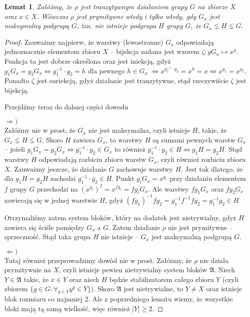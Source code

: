 \documentclass[licencjacka]{pracamgr}
\newtheorem{lemma}{Lemat}[section]
\begin{document}
\begin{lemma}\label{max_group}
	Załóżmy, że $\rho$ jest tranzytywnym działaniem grupy $G$ na zbiorze $X$ oraz $x \in X$.
	Wówczas $\rho$ jest prymitywne wtedy i tylko wtedy, gdy $G_x$ jest maksymalną podgrupą $G$, tzn.
	nie istnieje podgrupa $H$ grupy $G$, że $G_x \lneq H \lneq G$.
\end{lemma}
\begin{proof}
Zauważmy najpierw, że warstwy (lewostronne) $G_x$ odpowiadają jednoznacznie elementom zbioru $X$ --
bijekcja zadana jest wzorem $\zeta \colon g G_x \mapsto x^g$.
Funkcja ta jest dobrze określona oraz jest iniekcją, gdyż $g_1 G_x = g_2 G_x \iff g_1^{-1} \cdot g_2 = h$ dla pewnego $h \in G_x$
$\iff x^{g_1^{-1} \cdot g_2} = x^h = x \iff x^{g_1} = x^{g_2}$.
Ponadto $\zeta$ jest suriekcją, gdyż działanie jest tranzytywne, stąd rzeczywiście $\zeta$ jest bijekcją.

Przejdźmy teraz do dalszej części dowodu

$\Rightarrow)$ \\
Załóżmy nie w prost, że $G_x$ nie jest maksymalna, czyli istnieje $H$, takie, że $G_x \lneq H \lneq G$.
Skoro $H$ zawiera $G_x$, to warstwy $H$ są sumami pewnych warstw $G_x$ -- 
jeżeli $g_1 G_x = g_2 G_x \iff g_1^{-1} \cdot g_2 \in G_x$ to również $g_1^{-1} \cdot g_2 \in H \iff g_1 H = g_2 H$.
Stąd warstwy $H$ odpowiadają rozbiciu zbioru warstw $G_x$, czyli również rozbiciu zbioru $X$.
Zauważmy jeszcze, że działanie $G$ zachowuje warstwy $H$.
Jest tak dlatego, że dla $g_1 H = g_2 H$ zachodzi $g_1^{-1} \cdot g_2 \in H$.
Punkt $g_i G_x = x^{g_i}$ przy działaniu elementem $f$ grupy $G$ przechodzi na $(x^{g_i})^f = x^{f g_i} = f g_i G_x$.
Ale warstwy $f g_1 G_x$ oraz $f g_2 G_x$ zawierają się w jednej warstwie $H$, gdyż $(f g_1)^{-1} f g_2 = g_1^{-1} f^{-1} f g_2 = g_1^{-1} g_2 \in H$.

Otrzymaliśmy zatem system bloków, który na dodatek jest nietrywialny, gdyż $H$ zawiera się ściśle pomiędzy $G_x$ a $G$.
Zatem działanie $\rho$ nie jest prymitywne -- sprzeczność.
Stąd taka grupa $H$ nie istnieje -- $G_x$ jest maksymalną podgrupą $G$.

$\Leftarrow)$ \\
Tutaj również przeprowadzimy dowód nie w prost.
Załóżmy, że $\rho$ nie działa prymitywnie na $X$, czyli istnieje pewien nietrywialny system bloków $\mathfrak{A}$.
Niech $Y \in \mathfrak{A}$ takie, że $x \in Y$ oraz niech $H$ będzie stabilizatorem całego zbioru $Y$
(czyli zbiorem $\{g \in G \colon \forall_{y \in Y} y^g \in Y \}$).
Skoro $\mathfrak{A}$ jest nietrywialne, to $Y \ne X$ oraz istnieje blok rozmiaru co najmniej 2.
Ale z poprzedniego lematu wiemy, że wszystkie bloki mają tą samą wielkość, więc również $|Y| \ge 2$.


\end{proof}
\end{document}
